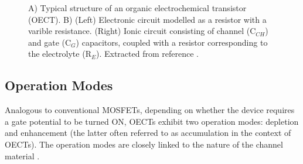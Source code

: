 \begin{figure}[h]
	\centering
	\hspace{2em}
	\caption[Typical OECT structure and circuit model]{A) Typical structure of an organic electrochemical transistor (OECT). B) (Left) Electronic circuit modelled as a resistor with a varible resistance. (Right) Ionic circuit consisting of channel (C$_{CH}$) and gate (C$_{G}$) capacitors, coupled with a resistor corresponding to the electrolyte (R$_{E}$). Extracted from reference \cite{rivnayOrganicElectrochemicalTransistors2018}.}
	\label{fig:bernard}
\end{figure}


\subsection{Operation Modes}

Analogous to conventional MOSFETs, depending on whether the device requires a gate potential to be turned ON, OECTs exhibit two operation modes: depletion and enhancement (the latter often referred to as accumulation in the context of OECTs). The operation modes are closely linked to the nature of the channel material%
.

